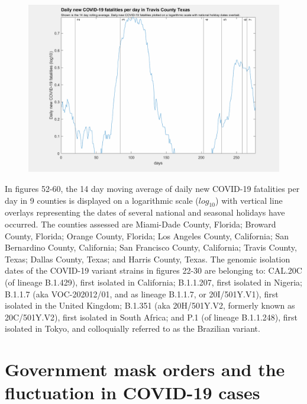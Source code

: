 \documentclass[]{article}
\begin{document}
\begin{figure}[!h]
	\includegraphics[width=\linewidth]{images/travis_fatalities_holiday_log.png}
	\caption{}
	\label{fig:images/travis_fatalities_holiday_logLabel}
\end{figure}

\FloatBarrier

In figures 52-60, the 14 day moving average of daily new COVID-19 fatalities per day in 9 counties is displayed on a logarithmic scale ($log_{10}$) with vertical line overlays representing the dates of several national and seasonal holidays have occurred. The counties assessed are Miami-Dade County, Florida; Broward County, Florida; Orange County, Florida; Los Angeles County, California; San Bernardino County, California; San Francisco County, California; Travis County, Texas; Dallas County, Texas; and Harris County, Texas. The genomic isolation dates of the COVID-19 variant strains in figures 22-30 are belonging to: CAL.20C (of lineage B.1.429), first isolated in California; B.1.1.207, first isolated in Nigeria; B.1.1.7 (aka VOC-202012/01, and as lineage B.1.1.7, or 20I/501Y.V1), first isolated in the United Kingdom; B.1.351 (aka 20H/501Y.V2, formerly known as 20C/501Y.V2), first isolated in South Africa; and P.1 (of lineage B.1.1.248), first isolated in Tokyo, and colloquially referred to as the Brazilian variant.


\FloatBarrier
\vspace{5mm}
\section*{Government mask orders and the fluctuation in COVID-19 cases }
\end{document}
